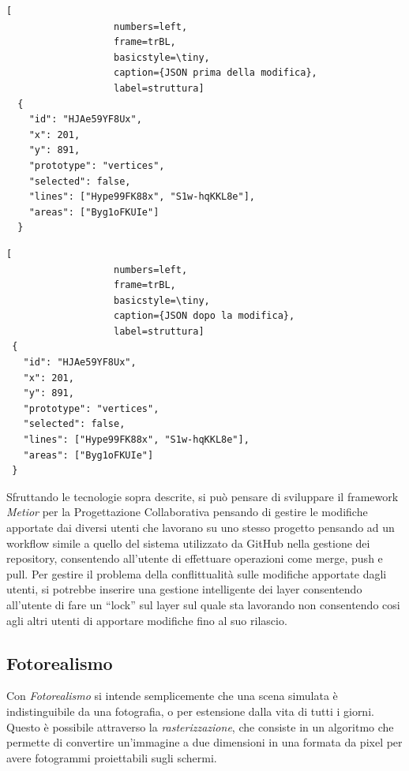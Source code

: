 \noindent
\begin{minipage}{.45\textwidth}
\begin{lstlisting}[
                   numbers=left,
                   frame=trBL,
                   basicstyle=\tiny,
                   caption={JSON prima della modifica},
                   label=struttura]
  {
    "id": "HJAe59YF8Ux",
    "x": 201,
    "y": 891,
    "prototype": "vertices",
    "selected": false,
    "lines": ["Hype99FK88x", "S1w-hqKKL8e"],
    "areas": ["Byg1oFKUIe"]
  }
\end{lstlisting}
\end{minipage}\hfill
\begin{minipage}{.45\textwidth}
\begin{lstlisting}[
                   numbers=left,
                   frame=trBL,
                   basicstyle=\tiny,
                   caption={JSON dopo la modifica},
                   label=struttura]
 {
   "id": "HJAe59YF8Ux",
   "x": 201,
   "y": 891,
   "prototype": "vertices",
   "selected": false,
   "lines": ["Hype99FK88x", "S1w-hqKKL8e"],
   "areas": ["Byg1oFKUIe"]
 }
\end{lstlisting}
\end{minipage}

Sfruttando le tecnologie sopra descrite, si può pensare di sviluppare il framework \emph{Metior} per la Progettazione Collaborativa
pensando di gestire le modifiche apportate dai diversi utenti che lavorano su uno stesso progetto pensando ad un workflow simile
a quello del sistema utilizzato da GitHub nella gestione dei repository, consentendo all'utente di effettuare operazioni come
merge, push e pull.
Per gestire il problema della conflittualità sulle modifiche apportate dagli utenti, si potrebbe inserire una gestione intelligente
dei layer consentendo all'utente di fare un ``lock'' sul layer sul quale sta lavorando non consentendo cosi agli altri utenti
di apportare modifiche fino al suo rilascio.
\newpage

\subsection{Fotorealismo}
\label{sec:conclusions_section_2_sub_3}
Con \emph{Fotorealismo} si intende semplicemente che una scena simulata \`e indistinguibile da una fotografia, o per estensione
dalla vita di tutti i giorni. Questo è possibile attraverso la \emph{rasterizzazione}, che consiste in un algoritmo che
permette di convertire un'immagine a due dimensioni in una formata da pixel per avere fotogrammi proiettabili sugli schermi.

